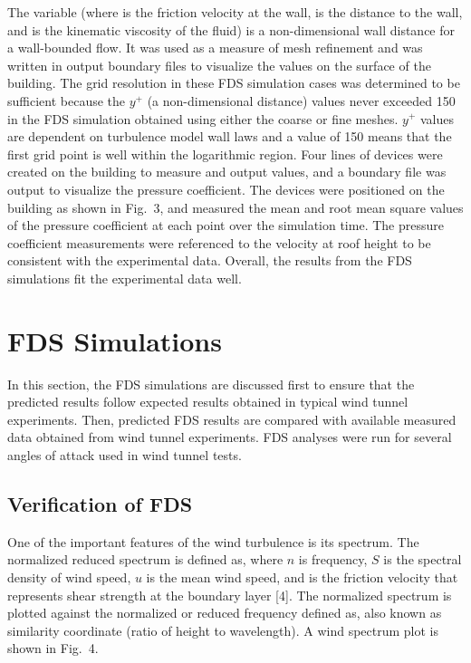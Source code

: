 The variable (where is the friction velocity at the wall, is the distance to the wall, and is the kinematic viscosity of the fluid) is a non-dimensional wall distance for a wall-bounded flow. It was used as a measure of mesh refinement and was written in output boundary files to visualize the values on the surface of the building. The grid resolution in these FDS simulation cases was determined to be sufficient because the $y^+$ (a non-dimensional distance) values never exceeded 150 in the FDS simulation obtained using either the coarse or fine meshes. $y^+$ values are dependent on turbulence model wall laws and a value of 150 means that the first grid point is well within the logarithmic region. Four lines of devices were created on the building to measure and output values, and a boundary file was output to visualize the pressure coefficient. The devices were positioned on the building as shown in Fig.~3, and measured the mean and root mean square values of the pressure coefficient at each point over the simulation time. The pressure coefficient measurements were referenced to the velocity at roof height to be consistent with the experimental data. Overall, the results from the FDS simulations fit the experimental data well.


\section{FDS Simulations}

In this section, the FDS simulations are discussed first to ensure that the predicted results follow expected results obtained in typical wind tunnel experiments. Then, predicted FDS results are compared with available measured data obtained from wind tunnel experiments. FDS analyses were run for several angles of attack used in wind tunnel tests.

\subsection{Verification of FDS}

One of the important features of the wind turbulence is its spectrum. The normalized reduced spectrum is defined as, where $n$ is frequency, $S$ is the spectral density of wind speed, $u$ is the mean wind speed, and  is the friction velocity that represents shear strength at the boundary layer [4]. The normalized spectrum is plotted against the normalized or reduced frequency defined as, also known as similarity coordinate (ratio of height to wavelength). A wind spectrum plot is shown in Fig.~4.
 

